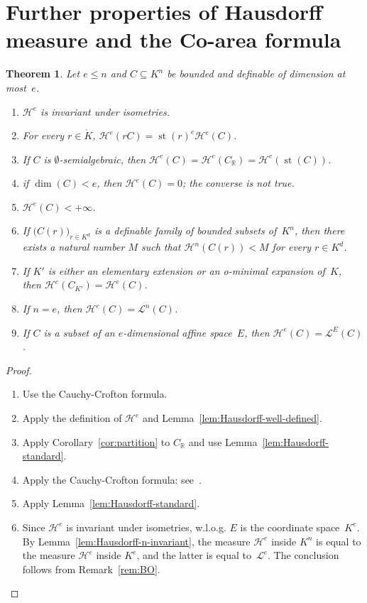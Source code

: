 \documentclass[a4paper, 12pt, final]{article}
\newtheorem{thm}[lem]{Theorem}
\newtheorem{open problem}[lem]{Open problem}
\theoremstyle{remark}
\theoremstyle{definition}
\newtheorem{final remark}[lem]{Final remark}
\begin{document}
\section[Coarea formula]{Further properties of Hausdorff measure and the
  Co-area formula}

\begin{thm}
Let $e \leq n$ and $C \subseteq {K}^n$ be bounded and definable of dimension 
at most~$e$.
\begin{enumerate}
\item ${{\mathcal H}^{e}}$ is invariant under isometries.
\item For every $r \in {\mathring {K}}$, ${{\mathcal H}^{e}}(r C) = \operatorname{st}(r)^e {{\mathcal H}^{e}}(C)$.
\item If $C$ is {$\emptyset$-semialgebraic\xspace}, then
${{\mathcal H}^{e}}(C) = {{\mathcal H}^{e}}(C_{\mathbb{R}}) = {{\mathcal H}^{e}}(\operatorname{st}(C))$.
\item if $\dim(C) < e$, then ${{\mathcal H}^{e}}(C) = 0$; the converse is not true.
\item ${{\mathcal H}^{e}}(C) < + \infty$.
\item If ${\bigl( {C(r)} \bigr)}_{r \in {K}^d}$ is a definable family of bounded subsets 
of~${K}^n$, then there exists a natural number $M$ such that ${{\mathcal H}^{n}}(C(r)) < M$
for every $r \in {K}^d$.
\item If ${K}'$ is either an elementary extension or an o-minimal expansion
of~${K}$, then ${{\mathcal H}^{e}}(C_{{K}'}) = {{\mathcal H}^{e}}(C)$.
\item If $n = e$, then ${{\mathcal H}^{e}}(C) = {{\mathcal L}^n}(C)$.
\item If $C$ is a subset of an $e$-dimensional affine space~$E$, 
then ${{\mathcal H}^{e}}(C) = {\mathcal L^E}(C)$.
\end{enumerate}
\end{thm}

\begin{proof}\
\begin{enumerate}
\item[(1)] Use the Cauchy-Crofton formula. 
\item[(2), (4) and (7)] Apply the definition of ${\mathcal H}^e$ and Lemma~\ref{lem:Hausdorff-well-defined}.
\item[(3)] Apply Corollary~\ref{cor:partition} to $C_{\mathbb{R}}$ and use
Lemma~\ref{lem:Hausdorff-standard}.
\item[(5) and (6)] Apply the Cauchy-Crofton formula: see~\cite{dries03}.
\item[(8)] Apply Lemma~\ref{lem:Hausdorff-standard}.
\item[(9)] Since ${{\mathcal H}^{e}}$ is invariant under isometries,
{w.l.o.g\mbox{.}\xspace} $E$ is the coordinate space~${K}^e$.
By Lemma~\ref{lem:Hausdorff-n-invariant}, the measure ${{\mathcal H}^{e}}$ inside ${K}^n$
is equal to the measure ${{\mathcal H}^{e}}$ inside ${K}^e$, and the latter is equal 
to~${\mathcal L}^e$.
The conclusion follows from Remark~\ref{rem:BO}.
\qedhere
\end{enumerate}
\end{proof}
\end{document}
